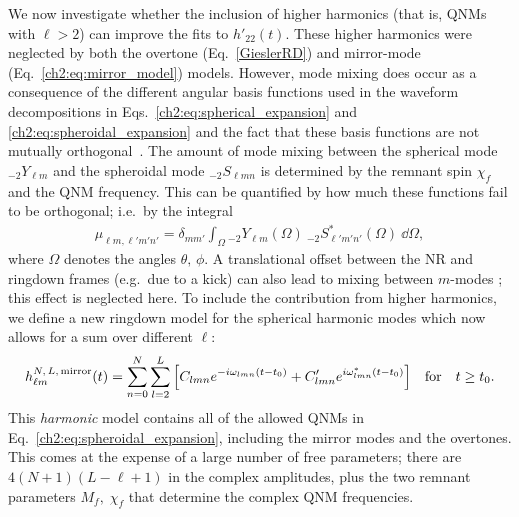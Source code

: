 We now investigate whether the inclusion of higher harmonics (that is, QNMs with $\ell > 2$) can improve the fits to $h'_{22}(t)$.
These higher harmonics were neglected by both the overtone (Eq.~\ref{GieslerRD}) and mirror-mode (Eq.~\ref{ch2:eq:mirror_model}) models.
However, mode mixing does occur as a consequence of the different angular basis functions used in the waveform decompositions in Eqs.~\ref{ch2:eq:spherical_expansion} and \ref{ch2:eq:spheroidal_expansion} and the fact that these basis functions are not mutually orthogonal~\cite{Berti:2014fga}.
The amount of mode mixing between the spherical mode ${}_{-2}Y_{\ell m}$ and the spheroidal mode ${}_{-2}S_{\ell m n}$ is determined by the remnant spin $\chi_f$ and the QNM frequency. This can be quantified by how much these functions fail to be orthogonal; i.e.\ by the integral
\begin{align}
     \mu_{\ell m, \ell' m' n'} = \delta_{mm'}\int_{\Omega} {}_{-2}Y_{\ell m}(\Omega)  ~ {}_{-2}S^*_{\ell ' m' n'}(\Omega) ~ \dd{\Omega},
\end{align}
where $\Omega$ denotes the angles $\theta,\,\phi$.
A translational offset between the NR and ringdown frames (e.g.\ due to a kick) can also lead to mixing between $m$-modes \cite{Boyle:2015nqa}; this effect is neglected here.
To include the contribution from higher harmonics, we define a new ringdown model for the spherical harmonic modes which now allows for a sum over different $\ell$:
\begin{equation}\label{full_ringdown}
    h_{\ell m}^{N,\,L,\, {\rm mirror}}(t) = \sum_{n=0}^N \sum_{l=2}^{L} \qty[ C_{l m n} e^{-i \omega_{l m n}(t-t_0)} + C'_{l m n} e^{i \omega^*_{l m n}(t-t_0)} ]\quad \textrm{for} \quad t \geq t_0.
\end{equation}
This \emph{harmonic} model contains all of the allowed QNMs in Eq.~\ref{ch2:eq:spheroidal_expansion}, including the mirror modes and the overtones.
This comes at the expense of a large number of free parameters; there are $4(N+1)(L-\ell+1)$ in the complex amplitudes, plus the two remnant parameters $M_f,\; \chi_f$ that determine the complex QNM frequencies.

